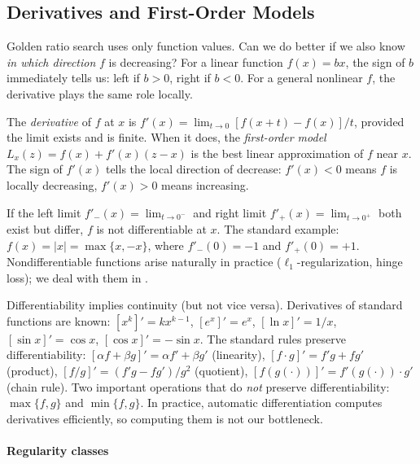 \subsection{Derivatives and First-Order Models}\label{sec:derivatives}

Golden ratio search uses only function values.
Can we do better if we also know \emph{in which direction} $f$ is decreasing?
For a linear function $f(x) = bx$, the sign of $b$ immediately tells us: left if $b > 0$, right if $b < 0$.
For a general nonlinear $f$, the derivative plays the same role locally.

\begin{definition}\label{def:derivative}
	The \textit{derivative} of $f$ at $x$ is $f'(x) = \lim_{t \to 0} [f(x + t) - f(x)] / t$, provided the limit exists and is finite.
	When it does, the \textit{first-order model} $L_x(z) = f(x) + f'(x)(z - x)$ is the best linear approximation of $f$ near $x$.
	The sign of $f'(x)$ tells the local direction of decrease: $f'(x) < 0$ means $f$ is locally decreasing, $f'(x) > 0$ means increasing.
\end{definition}

If the left limit $f'_-(x) = \lim_{t \to 0^-}$ and right limit $f'_+(x) = \lim_{t \to 0^+}$ both exist but differ, $f$ is not differentiable at $x$.
The standard example: $f(x) = |x| = \max\{x, -x\}$, where $f'_-(0) = -1$ and $f'_+(0) = +1$.
Nondifferentiable functions arise naturally in practice ($\ell_1$-regularization, hinge loss); we deal with them in .

Differentiability implies continuity (but not vice versa).
Derivatives of standard functions are known: $[x^k]' = kx^{k-1}$, $[e^x]' = e^x$, $[\ln x]' = 1/x$, $[\sin x]' = \cos x$, $[\cos x]' = -\sin x$.
The standard rules preserve differentiability:
$[\alpha f + \beta g]' = \alpha f' + \beta g'$ (linearity),
$[f \cdot g]' = f'g + fg'$ (product),
$[f/g]' = (f'g - fg')/g^2$ (quotient),
$[f(g(\cdot))]' = f'(g(\cdot)) \cdot g'$ (chain rule).
Two important operations that do \emph{not} preserve differentiability: $\max\{f, g\}$ and $\min\{f, g\}$.
In practice, automatic differentiation \cite{nocedal2006} computes derivatives efficiently, so computing them is not our bottleneck.

\paragraph{Regularity classes}

